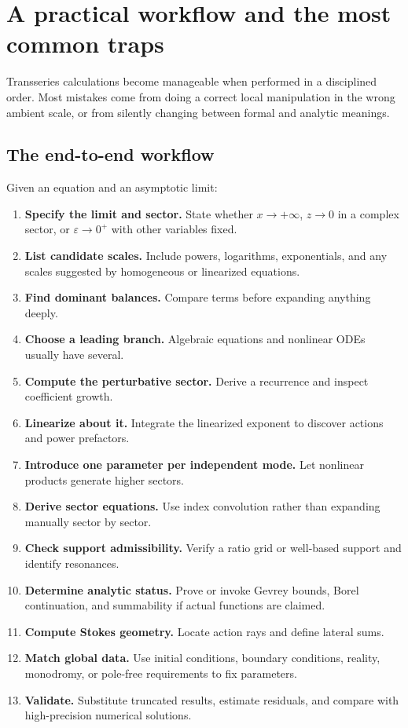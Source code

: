 \documentclass[11pt,openany]{book}
\theoremstyle{definition}
\theoremstyle{plain}
\theoremstyle{remark}
\newcommand{\eps}{\varepsilon}
\begin{document}
\chapter{A practical workflow and the most common traps}\label{ch:workflow}

Transseries calculations become manageable when performed in a disciplined order. Most mistakes come from doing a correct local manipulation in the wrong ambient scale, or from silently changing between formal and analytic meanings.

\section{The end-to-end workflow}

Given an equation and an asymptotic limit:

\begin{enumerate}
 \item \textbf{Specify the limit and sector.} State whether $x\to+\infty$, $z\to0$ in a complex sector, or $\eps\to0^+$ with other variables fixed.
 \item \textbf{List candidate scales.} Include powers, logarithms, exponentials, and any scales suggested by homogeneous or linearized equations.
 \item \textbf{Find dominant balances.} Compare terms before expanding anything deeply.
 \item \textbf{Choose a leading branch.} Algebraic equations and nonlinear ODEs usually have several.
 \item \textbf{Compute the perturbative sector.} Derive a recurrence and inspect coefficient growth.
 \item \textbf{Linearize about it.} Integrate the linearized exponent to discover actions and power prefactors.
 \item \textbf{Introduce one parameter per independent mode.} Let nonlinear products generate higher sectors.
 \item \textbf{Derive sector equations.} Use index convolution rather than expanding manually sector by sector.
 \item \textbf{Check support admissibility.} Verify a ratio grid or well-based support and identify resonances.
 \item \textbf{Determine analytic status.} Prove or invoke Gevrey bounds, Borel continuation, and summability if actual functions are claimed.
 \item \textbf{Compute Stokes geometry.} Locate action rays and define lateral sums.
 \item \textbf{Match global data.} Use initial conditions, boundary conditions, reality, monodromy, or pole-free requirements to fix parameters.
 \item \textbf{Validate.} Substitute truncated results, estimate residuals, and compare with high-precision numerical solutions.
\end{enumerate}
\end{document}

